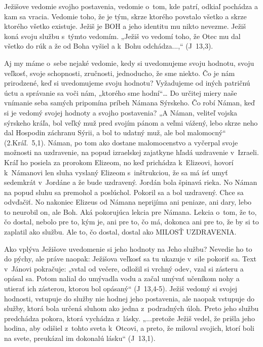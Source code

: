\def\velkostpisma{10}
\def\velkostriadku{12.5}



Ježišove vedomie svojho postavenia, vedomie o~tom, kde patrí, odkiaľ pochádza a kam sa vracia. Vedomie toho, že je tým, skrze ktorého povstalo všetko a skrze ktorého všetko existuje. Ježiš je BOH a jeho identitu mu nikto nevezme. Ježiš koná svoju službu s~týmto vedomím. „Ježiš vo vedomí toho, že Otec mu dal všetko do rúk a že od Boha vyšiel a k~Bohu odchádza...,“ (J~13,3).

Aj my máme o~sebe nejaké vedomie, kedy si uvedomujeme svoju hodnotu, svoju veľkosť, svoje schopnosti, zručnosti, jednoducho, že sme niekto. Čo je nám prirodzené, keď si uvedomujeme svoju hodnotu? Vyžadujeme od iných patričnú úctu a správanie sa voči nám, „ktorého sme hodní“… Do určitej miery naše vnímanie seba samých pripomína príbeh Námana Sýrskeho. Čo robí Náman, keď si je vedomý svojej hodnoty a svojho postavenia? „A Náman, veliteľ vojska sýrskeho kráľa, bol veľký muž pred svojím pánom a veľmi vážený, lebo skrze neho dal Hospodin záchranu Sýrii, a bol to udatný muž, ale bol malomocný“ (2.Kráľ.~5,1). Náman, po tom ako dostane malomocenstvo a vyčerpal svoje možnosti na uzdravenie, na popud izraelskej zajatkyne hľadá uzdravenie v~Izraeli. Kráľ ho posiela za prorokom Elizeom, no keď prichádza k~Elizeovi, hovorí k~Námanovi len sluha vyslaný Elizeom s~inštrukciou, že sa má ísť umyť sedemkrát v~Jordáne a že bude uzdravený. Jordán bola špinavá rieka. No Náman na popud sluhu sa premohol a poslúchol. Pokoril sa a bol uzdravený. Chce sa odvďačiť. No nakoniec Elizeus od Námana neprijíma ani peniaze, ani dary, lebo to neurobil on, ale Boh. Aká pokorujúca lekcia pre Námana. Lekcia o~tom, že to, čo dostal, nebolo pre to, kým je, ani pre to, čo má, dokonca ani pre to, že by si to zaplatil ako službu. Ale to, čo dostal, dostal ako MILOSŤ UZDRAVENIA.

Ako vplýva Ježišove uvedomenie si jeho hodnoty na Jeho službu? Nevedie ho to do pýchy, ale práve naopak: Ježišova veľkosť sa tu ukazuje v~sile pokoriť sa. Text v~Jánovi pokračuje: „vstal od večere, odložil si vrchný odev, vzal si zásteru a opásal sa. Potom nalial do umývadla vodu a začal umývať učeníkom nohy a utierať ich zásterou, ktorou bol opásaný“ (J~13,4-5). Ježiš vedomý si svojej hodnosti, vstupuje do služby nie hodnej jeho postavenia, ale naopak vstupuje do služby, ktorá bola určená sluhom ako jedna z~podradných úloh. Preto jeho službu predchádza pokora, ktorá vychádza z~lásky. „...pretože Ježiš vedel, že prišla jeho hodina, aby odišiel z~tohto sveta k~Otcovi, a preto, že miloval svojich, ktorí boli na svete, preukázal im dokonalú lásku“ (J~13,1).

